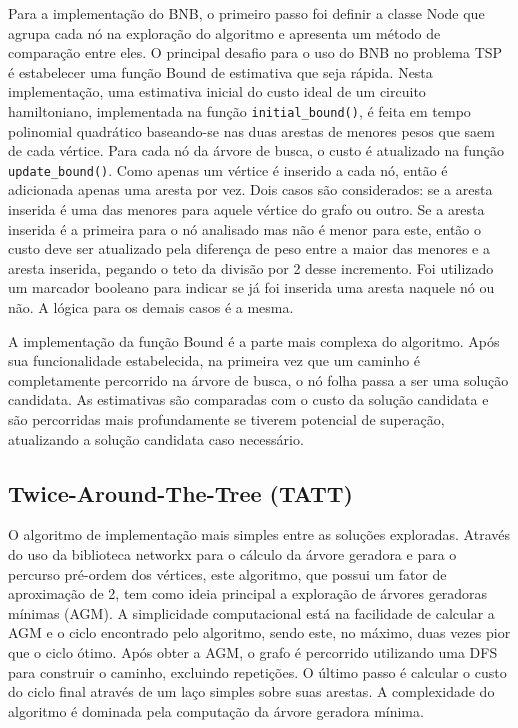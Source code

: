 \documentclass[12pt]{article}
\begin{document}
Para a implementação do BNB, o primeiro passo foi definir a classe Node que agrupa cada nó na exploração do algoritmo e apresenta um método de comparação entre eles. O principal desafio para o uso do BNB no problema TSP é estabelecer uma função Bound de estimativa que seja rápida. Nesta implementação, uma estimativa inicial do custo ideal de um circuito hamiltoniano, implementada na função \texttt{initial\_bound()}, é feita em tempo polinomial quadrático baseando-se nas duas arestas de menores pesos que saem de cada vértice. Para cada nó da árvore de busca, o custo é atualizado na função \texttt{update\_bound()}. Como apenas um vértice é inserido a cada nó, então é adicionada apenas uma aresta por vez. Dois casos são considerados: se a aresta inserida é uma das menores para aquele vértice do grafo ou outro. Se a aresta inserida é a primeira para o nó analisado mas não é menor para este, então o custo deve ser atualizado pela diferença de peso entre a maior das menores e a aresta inserida, pegando o teto da divisão por 2 desse incremento. Foi utilizado um marcador booleano para indicar se já foi inserida uma aresta naquele nó ou não. A lógica para os demais casos é a mesma. 

A implementação da função Bound é a parte mais complexa do algoritmo. Após sua funcionalidade estabelecida, na primeira vez que um caminho é completamente percorrido na árvore de busca, o nó folha passa a ser uma solução candidata. As estimativas são comparadas com o custo da solução candidata e são percorridas mais profundamente se tiverem potencial de superação, atualizando a solução candidata caso necessário.

\subsection{Twice-Around-The-Tree (TATT)}

O algoritmo de implementação mais simples entre as soluções exploradas. Através do uso da biblioteca networkx para o cálculo da árvore geradora e para o percurso pré-ordem dos vértices, este algoritmo, que possui um fator de aproximação de 2, tem como ideia principal a exploração de árvores geradoras mínimas (AGM). A simplicidade computacional está na facilidade de calcular a AGM e o ciclo encontrado pelo algoritmo, sendo este, no máximo, duas vezes pior que o ciclo ótimo. Após obter a AGM, o grafo é percorrido utilizando uma DFS para construir o caminho, excluindo repetições. O último passo é calcular o custo do ciclo final através de um laço simples sobre suas arestas. A complexidade do algoritmo é dominada pela computação da árvore geradora mínima.
\end{document}
